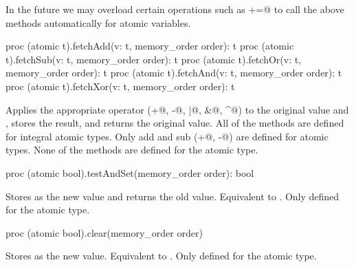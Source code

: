 \begin{future}
In the future we may overload certain operations such as \verb@+=@ to
call the above methods automatically for atomic variables.
\end{future}

\begin{protohead}
proc (atomic t).fetchAdd(v: t, memory_order order): t
proc (atomic t).fetchSub(v: t, memory_order order): t
proc (atomic t).fetchOr(v: t, memory_order order): t
proc (atomic t).fetchAnd(v: t, memory_order order): t
proc (atomic t).fetchXor(v: t, memory_order order): t
\end{protohead}
\begin{protobody}
Applies the appropriate operator (\verb@+@, \verb@-@, \verb@|@,
\verb@&@, \verb@^@) to the original value and , stores the result, and
returns the original value. All of the methods are defined for
integral atomic types. Only add and sub (\verb@+@, \verb@-@) are
defined for  atomic types.  None of the methods are defined
for the  atomic type.
\end{protobody}


\begin{protohead}
proc (atomic bool).testAndSet(memory_order order): bool
\end{protohead}
\begin{protobody}
Stores  as the new value and returns the old
value. Equivalent to . Only defined for
the  atomic type.
\end{protobody}

\begin{protohead}
proc (atomic bool).clear(memory_order order)
\end{protohead}
\begin{protobody}
Stores  as the new value. Equivalent
to . Only defined for the  atomic type.
\end{protobody}

